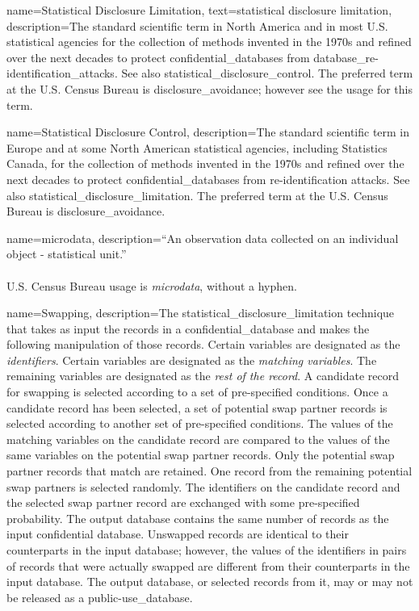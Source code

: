 {
    name=Statistical Disclosure Limitation,
    text=statistical disclosure limitation,
    description={The standard scientific term in North America and in most U.S. statistical agencies for the collection of methods invented in the 1970s and refined over the next decades to protect \glspl{confidential_database} from \glspl{database_re-identification_attack}. See also \gls{statistical_disclosure_control}. The preferred term at the U.S. Census Bureau is \gls{disclosure_avoidance}; however see the usage for this term.}
}

{
    name=Statistical Disclosure Control,
    description={The standard scientific term in Europe and at some North American statistical agencies, including Statistics Canada, for the collection of methods invented in the 1970s and refined over the next decades to protect \glspl{confidential_database} from re-identification attacks. See also \gls{statistical_disclosure_limitation}. The preferred term at the U.S. Census Bureau is \gls{disclosure_avoidance}.}
}

{
    name=microdata,
    description={``An observation data collected on an individual
    object - statistical unit.'' \parencite{oecd_oecd_nodate}\\
    \\
    U.S. Census Bureau usage is \textit{microdata}, without a hyphen.}
}

{
    name=Swapping,
    description={The \gls{statistical_disclosure_limitation} technique that takes as input the \glspl{record} in a \gls{confidential_database} and makes the following manipulation of those records. Certain variables are designated as the \textit{identifiers}. Certain variables are designated as the \textit{matching variables}. The remaining variables are designated as the \textit{rest of the record}. A candidate record for swapping is selected according to a set of pre-specified conditions. Once a candidate record has been selected, a set of potential swap partner records is selected according to another set of pre-specified conditions. The values of the matching variables on the candidate record are compared to the values of the same variables on the potential swap partner records. Only the potential swap partner records that match are retained. One record from the remaining potential swap partners is selected randomly. The identifiers on the candidate record and the selected swap partner record are exchanged with some pre-specified probability. The output database contains the same number of records as the input confidential database. Unswapped records are identical to their counterparts in the input database; however, the values of the identifiers in pairs of records that were actually swapped are different from their counterparts in the input database. The output database, or selected records from it, may or may not be released as a \gls{public-use_database}.}
}


